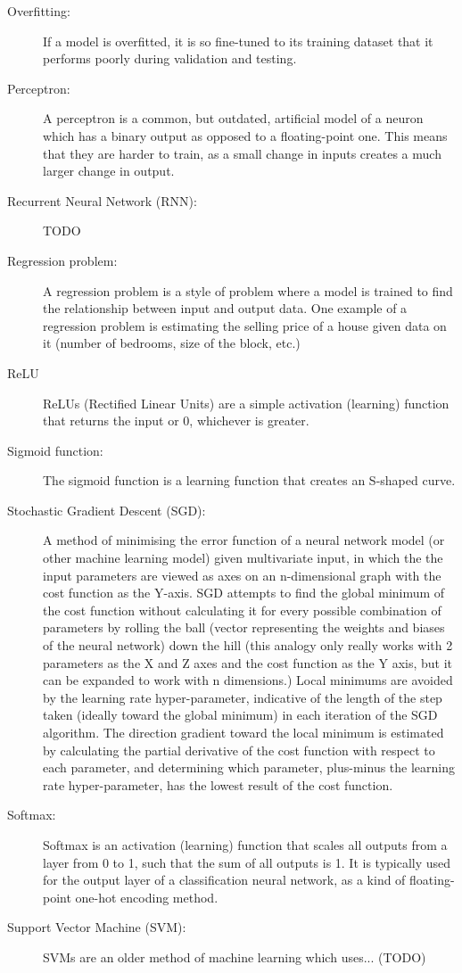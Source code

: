\documentclass[]{report}
\begin{document}
\begin{description}
\item[Overfitting:] If a model is overfitted, it is so fine-tuned to its training dataset that it performs poorly during validation and testing.

\item[Perceptron:] A perceptron is a common, but outdated, artificial model of a neuron which has a binary output as opposed to a floating-point one. This means that they are harder to train, as a small change in inputs creates a much larger change in output.

\item[Recurrent Neural Network (RNN):] TODO

\item[Regression problem:] A regression problem is a style of problem where a model is trained to find the relationship between input and output data. One example of a regression problem is estimating the selling price of a house given data on it (number of bedrooms, size of the block, etc.)	

\item[ReLU] ReLUs (Rectified Linear Units) are a simple activation (learning) function that returns the input or 0, whichever is greater.

\item[Sigmoid function:] The sigmoid function is a learning function that creates an S-shaped curve.

\label{itm:SGD}
\item[Stochastic Gradient Descent (SGD):] A method of minimising the error function of a neural network model (or other machine learning model) given multivariate input, in which the the input parameters are viewed as axes on an n-dimensional graph with the cost function as the Y-axis. SGD attempts to find the global minimum of the cost function without calculating it for every possible combination of parameters by rolling the ball (vector representing the weights and biases of the neural network) down the hill (this analogy only really works with 2 parameters as the X and Z axes and the cost function as the Y axis, but it can be expanded to work with n dimensions.) Local minimums are avoided by the learning rate hyper-parameter, indicative of the length of the step taken (ideally toward the global minimum) in each iteration of the SGD algorithm. The direction gradient toward the local minimum is estimated by calculating the partial derivative of the cost function with respect to each parameter, and determining which parameter, plus-minus the learning rate hyper-parameter, has the lowest result of the cost function.

\item[Softmax:] Softmax is an activation (learning) function that scales all outputs from a layer from 0 to 1, such that the sum of all outputs is 1. It is typically used for the output layer of a classification neural network, as a kind of floating-point one-hot encoding method.

\item[Support Vector Machine (SVM):] SVMs are an older method of machine learning which uses... (TODO)
\end{description}
\onecolumn

\printbibliography
\end{document}
